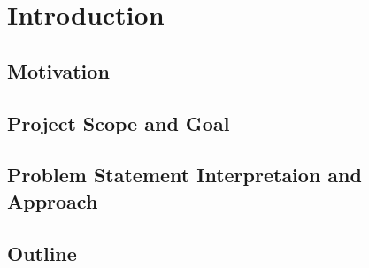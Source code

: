\chapter[Introduction]{Introduction}
\section{Motivation}
\section{Project Scope and Goal}
\section{Problem Statement Interpretaion and Approach}
\section{Outline}

